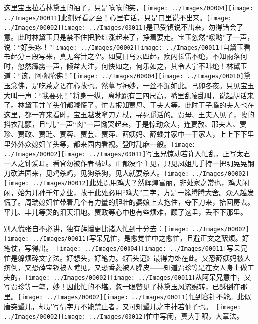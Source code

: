 这里宝玉拉着林黛玉的袖子，只是嘻嘻的笑，{\texttt{[image: ../Images/00004]}\texttt{[image: ../Images/00011]}\footnotesize \kaishu 此刻好看之至！}心里有话，只是口里说不出来。{\texttt{[image: ../Images/00002]}\texttt{[image: ../Images/00011]}\footnotesize \kaishu 是已受镇说不出来，勿得错会了意。}此时林黛玉只是禁不住把脸红涨起来了，挣着要走。宝玉忽然``嗳哟''了一声，说：``好头疼！''{\texttt{[image: ../Images/00002]}\texttt{[image: ../Images/00011]}\footnotesize \kaishu 自黛玉看书起分三段写来，真无容针之空。如夏日乌云四起，疾闪长雷不绝，不知雨落何时，忽然霹雳一声，倾盆大注，何快如之，何乐如之，其令人宁不叫绝！}林黛玉道：``该，阿弥陀佛！''{\texttt{[image: ../Images/00004]}\texttt{[image: ../Images/00010]}\footnotesize \kaishu 黛玉念佛，是吃茶之语在心故也。然摹写神妙，一丝不漏如此。己卯冬夜。}只见宝玉大叫一声：``我要死！''将身一纵，离地跳有三四尺高，嘴里乱嚷乱叫，说起胡话来了。林黛玉并丫头们都唬慌了，忙去报知贾母、王夫人等。此时王子腾的夫人也在这里，都一齐来看时，宝玉越发拿刀弄杖，寻死觅活的。贾母、王夫人见了，唬的抖衣乱颤，且``儿''一声``肉''一声恸哭起来。于是惊动众人，连贾赦、邢夫人、贾珍、贾政、贾琏、贾蓉、贾芸、贾萍、薛姨妈、薛蟠并家中一干家人，上上下下里里外外众媳妇丫头等，都来园内看视。登时乱麻一般。{\texttt{[image: ../Images/00002]}\texttt{[image: ../Images/00011]}\footnotesize \kaishu 写玉兄惊动若许人忙乱，正写太君一人之钟爱耳。看官勿被作者瞒过。}正都没个主见，只见凤姐儿手持一把明晃晃钢刀砍进园来，见鸡杀鸡，见狗杀狗，见人就要杀人。{\texttt{[image: ../Images/00002]}\texttt{[image: ../Images/00012]}\footnotesize \kaishu 此处焉用鸡犬？然辉煌富丽，非处家之常也，鸡犬闲闲，始为儿孙千年之业，故于此处必用``鸡犬''二字，方是一簇腾腾大舍。}众人越发慌了。周瑞媳妇忙带着几个有力量的胆壮的婆娘上去抱住，夺下刀来，抬回房去。平儿、丰儿等哭的泪天泪地。贾政等心中也有些烦难，顾了这里，丢不下那里。

别人慌张自不必讲，独有薛蟠更比诸人忙到十分去：{\texttt{[image: ../Images/00002]}\texttt{[image: ../Images/00011]}\footnotesize \kaishu 写呆兄忙，是愈觉忙中之愈忙，且避正文之絮烦。好笔仗，写得出。　\texttt{[image: ../Images/00004]}\texttt{[image: ../Images/00011]}\footnotesize \kaishu 写呆兄忙是躲烦碎文字法。好想头，好笔力。《石头记》最得力处在此。}又恐薛姨妈被人挤倒，又恐薛宝钗被人瞧见，又恐香菱被人臊皮------知道贾珍等是在女人身上做工夫的，{\texttt{[image: ../Images/00002]}\texttt{[image: ../Images/00011]}\footnotesize \kaishu 从阿呆兄意中，又写贾珍等一笔，妙！}因此忙的不堪。忽一眼瞥见了林黛玉风流婉转，已酥倒在那里。{\texttt{[image: ../Images/00002]}\texttt{[image: ../Images/00011]}\footnotesize \kaishu 忙到容针不能。此似唐突颦儿，却是写情字万不能禁止者，又可知颦儿之丰神若仙子也。　\texttt{[image: ../Images/00002]}\texttt{[image: ../Images/00012]}\footnotesize \kaishu 忙中写闲，真大手眼，大章法。}

